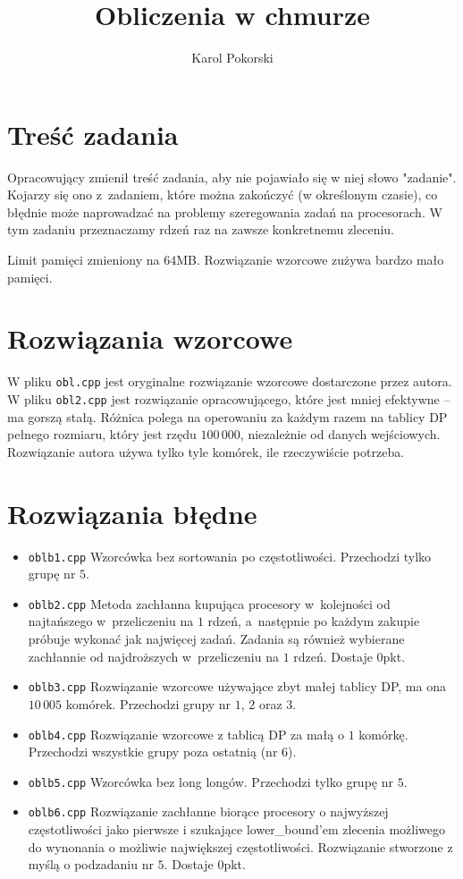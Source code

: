 \documentclass[opr,utf8]{sinol}
\title{Obliczenia w chmurze}
\author{Karol Pokorski} %
\begin{document}
  \begin{tasktext}%

  \section{Treść zadania}
    Opracowujący zmienił treść zadania, aby nie pojawiało się w niej słowo "zadanie".
    Kojarzy się ono z~zadaniem, które można zakończyć (w określonym czasie),
    co błędnie może naprowadzać na problemy szeregowania zadań na procesorach.
    W tym zadaniu przeznaczamy rdzeń raz na zawsze konkretnemu zleceniu.

    Limit pamięci zmieniony na 64MB. Rozwiązanie wzorcowe zużywa bardzo mało pamięci.

  \section{Rozwiązania wzorcowe}
    W pliku \texttt{obl.cpp} jest oryginalne rozwiązanie wzorcowe dostarczone
    przez autora. W pliku \texttt{obl2.cpp} jest rozwiązanie opracowującego,
    które jest mniej efektywne -- ma gorszą stałą. Różnica polega na operowaniu
    za każdym razem na tablicy DP pełnego rozmiaru, który jest rzędu $100\,000$,
    niezależnie od danych wejściowych. Rozwiązanie autora używa tylko tyle komórek,
    ile rzeczywiście potrzeba.

  \section{Rozwiązania błędne}
    \begin{itemize}
      \item \texttt{oblb1.cpp} Wzorcówka bez sortowania po częstotliwości. Przechodzi
          tylko grupę nr $5$.
      \item \texttt{oblb2.cpp} Metoda zachłanna kupująca procesory w~kolejności
          od najtańszego w~przeliczeniu na $1$ rdzeń, a~następnie po każdym zakupie
          próbuje wykonać jak najwięcej zadań. Zadania są również wybierane zachłannie
          od najdroższych w~przeliczeniu na $1$ rdzeń. Dostaje $0$pkt.
      \item \texttt{oblb3.cpp} Rozwiązanie wzorcowe używające zbyt małej tablicy
          DP, ma ona $10\,005$ komórek. Przechodzi grupy nr $1$, $2$ oraz $3$.
      \item \texttt{oblb4.cpp} Rozwiązanie wzorcowe z tablicą DP za małą o $1$ komórkę.
          Przechodzi wszystkie grupy poza ostatnią (nr $6$).
      \item \texttt{oblb5.cpp} Wzorcówka bez long longów. Przechodzi tylko grupę nr $5$.
      \item \texttt{oblb6.cpp} Rozwiązanie zachłanne biorące procesory o najwyższej częstotliwości
        jako pierwsze i szukające lower\_bound'em zlecenia możliwego do wynonania o możliwie
        największej częstotliwości. Rozwiązanie stworzone z myślą o podzadaniu nr $5$.
        Dostaje $0$pkt.
    \end{itemize}


\end{tasktext}
\end{document}
